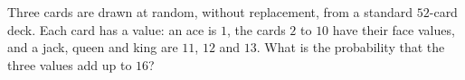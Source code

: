 Three cards are drawn at random, without replacement, from a standard $52$-card deck. Each card has a value: an ace is $1$, the cards $2$ to $10$ have their face values, and a jack, queen and king are $11$, $12$ and $13$. What is the probability that the three values add up to $16$?
